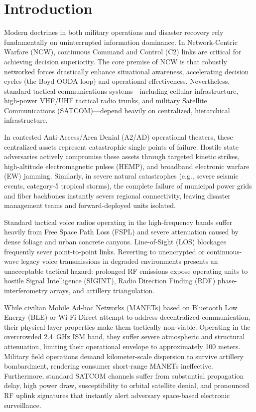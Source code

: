 \documentclass[conference]{IEEEtran}
\begin{document}
\section{Introduction}
Modern doctrines in both military operations and disaster recovery rely fundamentally on uninterrupted information dominance. In Network-Centric Warfare (NCW), continuous Command and Control (C2) links are critical for achieving decision superiority. The core premise of NCW is that robustly networked forces drastically enhance situational awareness, accelerating decision cycles (the Boyd OODA loop) and operational effectiveness. Nevertheless, standard tactical communications systems---including cellular infrastructure, high-power VHF/UHF tactical radio trunks, and military Satellite Communications (SATCOM)---depend heavily on centralized, hierarchical infrastructure.

In contested Anti-Access/Area Denial (A2/AD) operational theaters, these centralized assets represent catastrophic single points of failure. Hostile state adversaries actively compromise these assets through targeted kinetic strikes, high-altitude electromagnetic pulses (HEMP), and broadband electronic warfare (EW) jamming. Similarly, in severe natural catastrophes (e.g., severe seismic events, category-5 tropical storms), the complete failure of municipal power grids and fiber backbones instantly severs regional connectivity, leaving disaster management teams and forward-deployed units isolated.

Standard tactical voice radios operating in the high-frequency bands suffer heavily from Free Space Path Loss (FSPL) and severe attenuation caused by dense foliage and urban concrete canyons. Line-of-Sight (LOS) blockages frequently sever point-to-point links. Reverting to unencrypted or continuous-wave legacy voice transmissions in degraded environments presents an unacceptable tactical hazard: prolonged RF emissions expose operating units to hostile Signal Intelligence (SIGINT), Radio Direction Finding (RDF) phase-interferometry arrays, and artillery triangulation.

While civilian Mobile Ad-hoc Networks (MANETs) based on Bluetooth Low Energy (BLE) or Wi-Fi Direct attempt to address decentralized communication, their physical layer properties make them tactically non-viable. Operating in the overcrowded 2.4~GHz ISM band, they suffer severe atmospheric and structural attenuation, limiting their operational envelope to approximately 100 meters. Military field operations demand kilometer-scale dispersion to survive artillery bombardment, rendering consumer short-range MANETs ineffective. Furthermore, standard SATCOM channels suffer from substantial propagation delay, high power draw, susceptibility to orbital satellite denial, and pronounced RF uplink signatures that instantly alert adversary space-based electronic surveillance.
\end{document}
